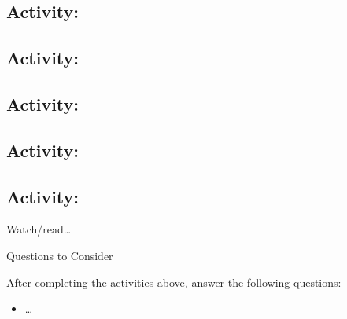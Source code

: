 \documentclass[
]{book}
\providecommand{\tightlist}{%
  \setlength{\itemsep}{0pt}\setlength{\parskip}{0pt}}
\theoremstyle{definition}
\theoremstyle{definition}
\theoremstyle{definition}
\theoremstyle{definition}
\theoremstyle{remark}
\begin{document}
\hypertarget{activity-10}{%
\subsection*{Activity:}\label{activity-10}}

\begin{reflect}
\end{reflect}

\hypertarget{activity-11}{%
\subsection*{Activity:}\label{activity-11}}

\begin{reflect}
\end{reflect}

\hypertarget{activity-12}{%
\subsection*{Activity:}\label{activity-12}}

\begin{reflect}
\end{reflect}

\hypertarget{activity-13}{%
\subsection*{Activity:}\label{activity-13}}

\begin{reflect}
\end{reflect}

\hypertarget{activity-14}{%
\subsection*{Activity:}\label{activity-14}}

\begin{reflect}
Watch/read\ldots{}

{Questions to Consider}

After completing the activities above, answer the following questions:

\begin{itemize}
\tightlist
\item
  \ldots{}
\end{itemize}
\end{reflect}
\end{document}
